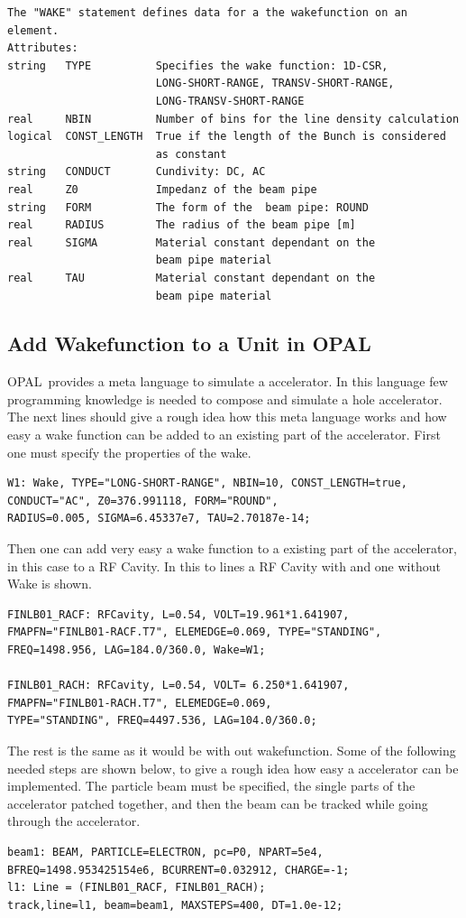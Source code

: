 \documentclass[11pt,a4paper]{article}
\newcommand{\opal}{\textsc{OPAL}}
\begin{document}
\begin{verbatim}
The "WAKE" statement defines data for a the wakefunction on an element.
Attributes:
string   TYPE          Specifies the wake function: 1D-CSR, 
                       LONG-SHORT-RANGE, TRANSV-SHORT-RANGE, 
                       LONG-TRANSV-SHORT-RANGE
real     NBIN          Number of bins for the line density calculation
logical  CONST_LENGTH  True if the length of the Bunch is considered
                       as constant
string   CONDUCT       Cundivity: DC, AC
real     Z0            Impedanz of the beam pipe
string   FORM          The form of the  beam pipe: ROUND
real     RADIUS        The radius of the beam pipe [m]
real     SIGMA         Material constant dependant on the  
                       beam pipe material
real     TAU           Material constant dependant on the  
                       beam pipe material
\end{verbatim}

\subsection{Add Wakefunction to a Unit in \opal}
\opal\ provides a meta language to simulate a accelerator. In this language few programming knowledge is needed to compose and simulate a hole accelerator. The next lines should give a rough idea how this meta language works and how easy a wake function can be added to an existing part of the accelerator.
First one must specify the properties of the wake.
\begin{verbatim}
W1: Wake, TYPE="LONG-SHORT-RANGE", NBIN=10, CONST_LENGTH=true,
CONDUCT="AC", Z0=376.991118, FORM="ROUND",
RADIUS=0.005, SIGMA=6.45337e7, TAU=2.70187e-14;
\end{verbatim}
Then one can add very easy a wake function to a existing part of the accelerator, in this case to a RF Cavity. In this to lines a RF Cavity with and one without Wake is shown.
\begin{verbatim}
FINLB01_RACF: RFCavity, L=0.54, VOLT=19.961*1.641907, 
FMAPFN="FINLB01-RACF.T7", ELEMEDGE=0.069, TYPE="STANDING", 
FREQ=1498.956, LAG=184.0/360.0, Wake=W1;

FINLB01_RACH: RFCavity, L=0.54, VOLT= 6.250*1.641907, 
FMAPFN="FINLB01-RACH.T7", ELEMEDGE=0.069, 
TYPE="STANDING", FREQ=4497.536, LAG=104.0/360.0;
\end{verbatim}
The rest is the same as it would be with out wakefunction. Some of the following needed steps are shown below, to give a rough idea how easy a accelerator can be implemented. The particle beam must be specified, the single parts of the accelerator patched together, and then the beam can be tracked while going through the accelerator.
\begin{verbatim}
beam1: BEAM, PARTICLE=ELECTRON, pc=P0, NPART=5e4, 
BFREQ=1498.953425154e6, BCURRENT=0.032912, CHARGE=-1;
l1: Line = (FINLB01_RACF, FINLB01_RACH);
track,line=l1, beam=beam1, MAXSTEPS=400, DT=1.0e-12;
\end{verbatim}
\end{document}
